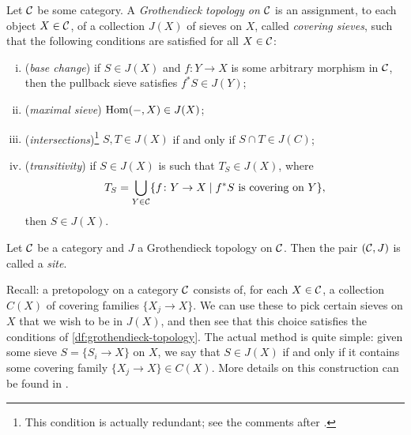         \begin{definition}\label{df:grothendieck-topology}
            Let $\mathcal{C}$ be some category.
            A \emph{Grothendieck topology on $\mathcal{C}$} is an assignment, to each object $X\in\mathcal{C}$, of a collection $J(X)$ of sieves on $X$, called \emph{covering sieves}, such that the following conditions are satisfied for all $X\in\mathcal{C}$:
            \begin{enumerate}[(i)]
                \item (\emph{base change}) if $S\in J(X)$ and $f\colon Y\to X$ is some arbitrary morphism in $\mathcal{C}$, then the pullback sieve satisfies $f^* S\in J(Y)$;
                \item (\emph{maximal sieve}) $\operatorname{Hom}({-},X)\in J(X)$;
                \item (\emph{intersections})\footnote{
                    This condition is actually redundant; see the comments after \cite[Definition~1,~\S III.2]{MacLane:1992uz}.
                } $S,T\in J(X)$ if and only if $S\cap T\in J(C)$;
                \item (\emph{transitivity}) if $S\in J(X)$ is such that $T_S\in J(X)$, where
                    \begin{equation*}
                        T_S=\bigcup_{Y\in\mathcal{C}}\{f\colon Y\to X \mid f^* S\text{ is covering on }Y\},
                    \end{equation*}
                    then $S\in J(X)$.\qedhere
            \end{enumerate}
        \end{definition}

        \begin{definition}[Site]\label{df:site}
            Let $\mathcal{C}$ be a category and $J$ a Grothendieck topology on $\mathcal{C}$.
            Then the pair $(\mathcal{C},J)$ is called a \emph{site}.
        \end{definition}

        Recall: a pretopology on a category $\mathcal{C}$ consists of, for each $X\in\mathcal{C}$, a collection $C(X)$ of covering families $\{X_j\to X\}$.
        We can use these to pick certain sieves on $X$ that we wish to be in $J(X)$, and then see that this choice satisfies the conditions of \cref{df:grothendieck-topology}.
        The actual method is quite simple: given some sieve $S=\{S_i\to X\}$ on $X$, we say that $S\in J(X)$ if and only if it contains some covering family $\{X_j\to X\}\in C(X)$.
        More details on this construction can be found in \cite[\S III.2]{MacLane:1992uz}.

